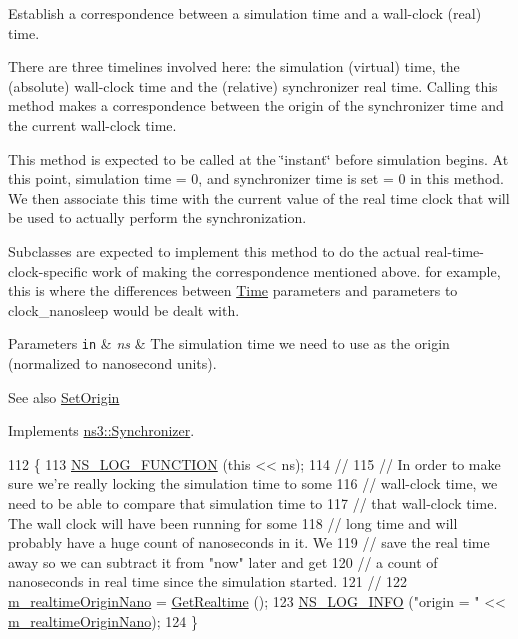 Establish a correspondence between a simulation time and a wall-\/clock (real) time. 

There are three timelines involved here\+: the simulation (virtual) time, the (absolute) wall-\/clock time and the (relative) synchronizer real time. Calling this method makes a correspondence between the origin of the synchronizer time and the current wall-\/clock time.

This method is expected to be called at the \char`\"{}instant\char`\"{} before simulation begins. At this point, simulation time = 0, and synchronizer time is set = 0 in this method. We then associate this time with the current value of the real time clock that will be used to actually perform the synchronization.

Subclasses are expected to implement this method to do the actual real-\/time-\/clock-\/specific work of making the correspondence mentioned above. for example, this is where the differences between \hyperlink{classns3_1_1Time}{Time} parameters and parameters to clock\+\_\+nanosleep would be dealt with.


\begin{DoxyParams}[1]{Parameters}
\mbox{\tt in}  & {\em ns} & The simulation time we need to use as the origin (normalized to nanosecond units). \\
\hline
\end{DoxyParams}
\begin{DoxySeeAlso}{See also}
\hyperlink{classns3_1_1Synchronizer_a28e1732f6db4e918491cc58a3236e544}{Set\+Origin} 
\end{DoxySeeAlso}


Implements \hyperlink{classns3_1_1Synchronizer_aee90af19ede115e7706db3861d53660d}{ns3\+::\+Synchronizer}.


\begin{DoxyCode}
112 \{
113   \hyperlink{log-macros-disabled_8h_a90b90d5bad1f39cb1b64923ea94c0761}{NS\_LOG\_FUNCTION} (\textcolor{keyword}{this} << ns);
114 \textcolor{comment}{//}
115 \textcolor{comment}{// In order to make sure we're really locking the simulation time to some }
116 \textcolor{comment}{// wall-clock time, we need to be able to compare that simulation time to}
117 \textcolor{comment}{// that wall-clock time.  The wall clock will have been running for some}
118 \textcolor{comment}{// long time and will probably have a huge count of nanoseconds in it.  We}
119 \textcolor{comment}{// save the real time away so we can subtract it from "now" later and get}
120 \textcolor{comment}{// a count of nanoseconds in real time since the simulation started.}
121 \textcolor{comment}{//}
122   \hyperlink{classns3_1_1Synchronizer_a8156cd6893af54e80108f5630c63c2ab}{m\_realtimeOriginNano} = \hyperlink{classns3_1_1WallClockSynchronizer_a9ffb2b0572abca0763b56889a72867dd}{GetRealtime} ();
123   \hyperlink{group__logging_gafbd73ee2cf9f26b319f49086d8e860fb}{NS\_LOG\_INFO} (\textcolor{stringliteral}{"origin = "} << \hyperlink{classns3_1_1Synchronizer_a8156cd6893af54e80108f5630c63c2ab}{m\_realtimeOriginNano});
124 \}
\end{DoxyCode}


